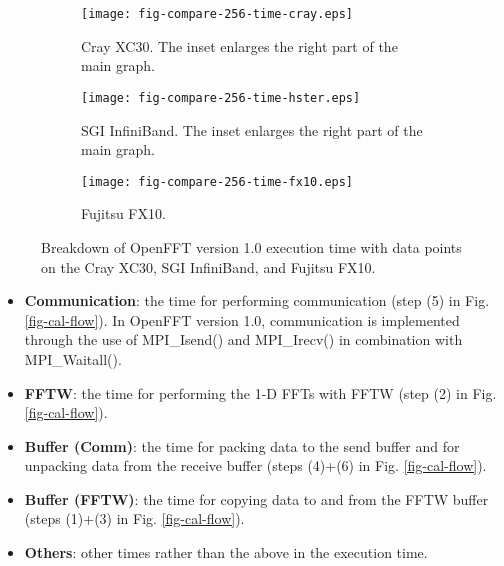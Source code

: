 \begin{figure}[htbp]
        \begin{subfigure}{\textwidth}
                \centering
                \texttt{[image: fig-compare-256-time-cray.eps]}
                \caption{Cray XC30. The inset enlarges the right part of the main graph.}
                \label{fig-breakdown-cray}
        \end{subfigure}

        \begin{subfigure}{\textwidth}
                \centering
                \texttt{[image: fig-compare-256-time-hster.eps]}
                \caption{SGI InfiniBand. The inset enlarges the right part of the main graph.}
                \label{fig-breakdown-hster}
        \end{subfigure}

        \begin{subfigure}{\textwidth}
                \centering
                \texttt{[image: fig-compare-256-time-fx10.eps]}
                \caption{Fujitsu FX10.}
                \label{fig-breakdown-fx10}
        \end{subfigure}\caption{Breakdown of OpenFFT version 1.0 execution time with  data points on the Cray XC30, SGI InfiniBand, and Fujitsu FX10.}\label{fig-breakdown-time}
\end{figure}

\begin{itemize}
\item
\textbf{Communication}: the time for performing communication (step (5) in Fig. \ref{fig-cal-flow}). In OpenFFT version 1.0, communication is implemented through the use of MPI\_Isend() and MPI\_Irecv() in combination with MPI\_Waitall(). 
\item
\textbf{FFTW}: the time for performing the 1-D FFTs with FFTW (step (2) in Fig. \ref{fig-cal-flow}). 
\item
\textbf{Buffer (Comm)}: the time for packing data to the send buffer and for unpacking data from the receive buffer (steps (4)+(6) in Fig. \ref{fig-cal-flow}).  
\item
\textbf{Buffer (FFTW)}: the time for copying data to and from the FFTW buffer (steps (1)+(3) in Fig. \ref{fig-cal-flow}).  
\item
\textbf{Others}: other times rather than the above in the execution time.
\end{itemize}

